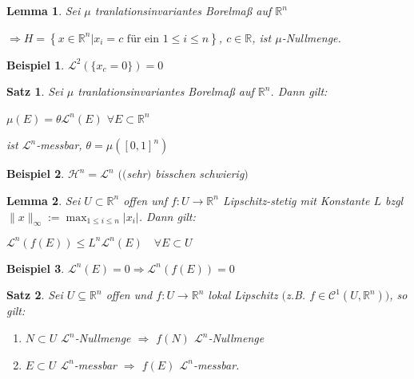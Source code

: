 \documentclass[11pt]{memoir}
\theoremstyle{changebreak}
\newtheorem{Beispiel}{Beispiel}[chapter]
\newtheorem{Lemma}{Lemma}[chapter]
\newtheorem{Satz}{Satz}[chapter]
\begin{document}

\begin{Lemma}
Sei $\mu$ tranlationsinvariantes Borelmaß auf $\mathbb R^n$
\begin{center}
	$\Rightarrow H = \left\{x \in \mathbb R^n | x_i = c \text{ für ein } 1\leq i \leq n\right\}$, $c \in \mathbb R$, ist $\mu$-Nullmenge.
\end{center}
\end{Lemma}

\begin{Beispiel}
$\mathscr L^2(\{x_c = 0\}) = 0$
\end{Beispiel}

\begin{Satz}
Sei $\mu$ tranlationsinvariantes Borelmaß auf $\mathbb R^n$. Dann gilt:
\begin{center}
	$\mu(E) = \theta \mathscr L^n(E)$ $ \forall E \subset \mathbb R^n$
\end{center}
ist $\mathscr L^n$-messbar, $\theta = \mu([0, 1]^n)$
\end{Satz}

\begin{Beispiel}
$\mathscr H^n = \mathscr L^n$ $(($sehr$)$ bisschen schwierig$)$
\end{Beispiel}

\begin{Lemma}
Sei $U \subset \mathbb R^n$ offen unf $f: U \rightarrow \mathbb R^n$ Lipschitz-stetig mit Konstante $L$ bzgl $\|x\|_\infty := \max_{1 \leq i \leq n} |x_i |$. Dann gilt:
\begin{center}
	$\mathscr L^n(f(E)) \leq L^n \mathscr L^n (E)\quad \forall E \subset U$
\end{center}
\end{Lemma}

\begin{Beispiel}
$\mathscr L^n(E) = 0 \Rightarrow \mathscr L^n(f(E)) = 0$
\end{Beispiel}



\begin{Satz}
Sei $U \subseteq \mathbb R^n$ offen und $f: U \rightarrow \mathbb R^n$ lokal Lipschitz $($z.B. $f \in \mathscr C^1(U, \mathbb R^n))$, so gilt:
\begin{enumerate}
	\item $N \subset U$ $\mathscr L^n$-Nullmenge $\Rightarrow$ $f(N)$ $\mathscr L^n$-Nullmenge
	\item $E \subset U$ $\mathscr L^n$-messbar $\Rightarrow$ $f(E)$ $\mathscr L^n$-messbar.
\end{enumerate}
\end{Satz}
\end{document}
